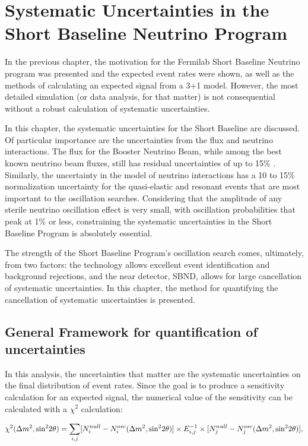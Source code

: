 \chapter{Systematic Uncertainties in the Short Baseline Neutrino Program}

In the previous chapter, the motivation for the Fermilab Short Baseline Neutrino program was presented and the expected event rates were shown, as well as the methods of calculating an expected signal from a 3+1 model.  However, the most detailed simulation (or data analysis, for that matter) is not consequential without a robust calculation of systematic uncertainties.

In this chapter, the systematic uncertainties for the Short Baseline are discussed.  Of particular importance are the uncertainties from the flux and neutrino interactions.  The flux for the Booster Neutrino Beam, while among the best known neutrino beam fluxes, still has residual uncertainties of up to 15\% \cite{miniboone_flux_paper}.  Similarly, the uncertainty in the model of neutrino interactions has a 10 to 15\% normalization uncertainty for the quasi-elastic and resonant events that are most important to the oscillation searches.  Considering that the amplitude of any sterile neutrino oscillation effect is very small, with oscillation probabilities that peak at 1\% or less, constraining the systematic uncertainties in the Short Baseline Program is absolutely essential.

The strength of the Short Baseline Program's oscillation search comes, ultimately, from two factors:  the \lartpc technology allows excellent event identification and background rejections, and the near detector, SBND, allows for large cancellation of systematic uncertainties.  In this chapter, the method for quantifying the cancellation of systematic uncertainties is presented.


\section{General Framework for quantification of uncertainties}

In this analysis, the uncertainties that matter are the systematic uncertainties on the final distribution of event rates.  Since the goal is to produce a sensitivity calculation for an expected signal, the numerical value of the sensitivity can be calculated with a $\chi^2$ calculation:

\begin{equation}
\begin{centering}
\chi^2(\Delta m^2, \text{sin}^2 2 \theta ) = \sum_{i,j} [N^{null}_i - N^{osc}_i(\Delta m^2, \text{sin}^2 2 \theta ) ] \times E^{-1}_{i,j} \times [N^{null}_j - N^{osc}_j(\Delta m^2, \text{sin}^2 2 \theta ) ],
\end{centering}
\end{equation}


